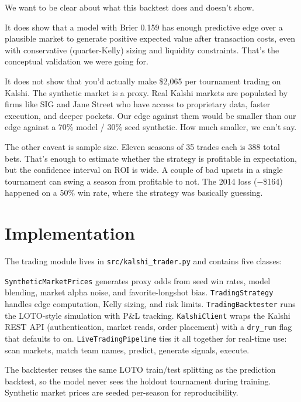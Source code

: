 \documentclass[11pt,a4paper]{article}
\begin{document}
We want to be clear about what this backtest does and doesn't show.

It does show that a model with Brier 0.159 has enough predictive edge over a plausible market to generate positive expected value after transaction costs, even with conservative (quarter-Kelly) sizing and liquidity constraints. That's the conceptual validation we were going for.

It does not show that you'd actually make \$2{,}065 per tournament trading on Kalshi. The synthetic market is a proxy. Real Kalshi markets are populated by firms like SIG and Jane Street who have access to proprietary data, faster execution, and deeper pockets. Our edge against them would be smaller than our edge against a 70\% model / 30\% seed synthetic. How much smaller, we can't say.

The other caveat is sample size. Eleven seasons of 35 trades each is 388 total bets. That's enough to estimate whether the strategy is profitable in expectation, but the confidence interval on ROI is wide. A couple of bad upsets in a single tournament can swing a season from profitable to not. The 2014 loss ($-$\$164) happened on a 50\% win rate, where the strategy was basically guessing.


\section{Implementation}

The trading module lives in \texttt{src/kalshi\_trader.py} and contains five classes:

\texttt{SyntheticMarketPrices} generates proxy odds from seed win rates, model blending, market alpha noise, and favorite-longshot bias. \texttt{TradingStrategy} handles edge computation, Kelly sizing, and risk limits. \texttt{TradingBacktester} runs the LOTO-style simulation with P\&L tracking. \texttt{KalshiClient} wraps the Kalshi REST API (authentication, market reads, order placement) with a \texttt{dry\_run} flag that defaults to on. \texttt{LiveTradingPipeline} ties it all together for real-time use: scan markets, match team names, predict, generate signals, execute.

The backtester reuses the same LOTO train/test splitting as the prediction backtest, so the model never sees the holdout tournament during training. Synthetic market prices are seeded per-season for reproducibility.
\end{document}
